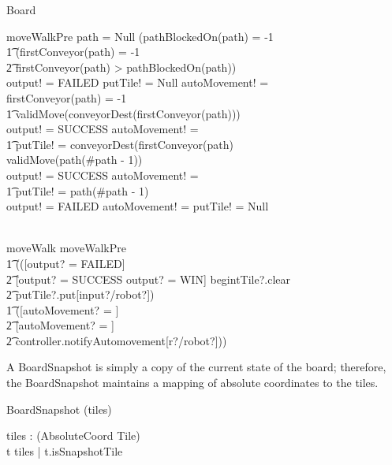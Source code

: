 \documentclass[12pt]{article}
\begin{document}
\begin{class}{Board}
\begin{schema}{moveWalkPre}
\also \also \also \also
\IF path = Null \vee (pathBlockedOn(path) \not = -1 \; \;\wedge \\ \t1 (firstConveyor(path) = -1 \; \; \vee \\ \t2 firstConveyor(path) > pathBlockedOn(path)) \\
\THEN output! = FAILED \; \; \wedge putTile! = Null \wedge autoMovement! = \false \\
\ELSE \IF firstConveyor(path) \not = -1 \; \; \wedge \\ \t1 validMove(conveyorDest(firstConveyor(path))) \\
\THEN output! = SUCCESS \wedge autoMovement! = \true \;\; \wedge \\ \t1 putTile! = conveyorDest(firstConveyor(path) \\
\ELSE \IF validMove(path(\#path - 1)) \\
\THEN output! = SUCCESS \wedge autoMovement! = \false \; \; \wedge \\ \t1  putTile! = path(\#path - 1) \\
\ELSE output! = FAILED \wedge autoMovement! = \false \wedge putTile! = Null
\end{schema} \\
moveWalk \sdef moveWalkPre \; \; \comp \\ \t1 (([output? = FAILED] \; \; [] \\ \t2 [output? = SUCCESS \vee output? = WIN] \wedge begintTile?.clear \; \; \wedge \\ \t2 putTile?.put[input?/robot?]) \; \; \wedge \\ \t1 ([autoMovement? = \false] \; \; [] \\ \t2 [autoMovement? = \true] \; \; \wedge \\ \t2 controller.notifyAutomovement[r?/robot?]))
\end{class}

A BoardSnapshot is simply a copy of the current state of the board; therefore, the BoardSnapshot maintains a mapping of absolute coordinates to the tiles.
\begin{class}{BoardSnapshot}
\upharpoonright (tiles) \\
\begin{state}
tiles : \power (AbsoluteCoord \fun Tile) \\
\where
\forall t \ran tiles | t.isSnapshotTile
\end{state}
\end{class}
\end{document}
